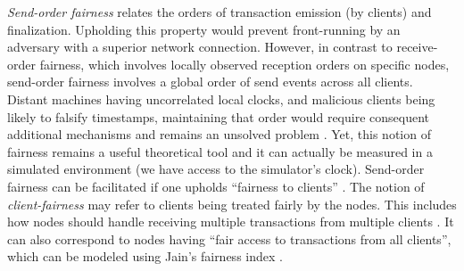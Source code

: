 {\em Send-order fairness} \cite{order_fairness_for_byzantine_consensus} relates the orders of transaction emission (by clients) and finalization. Upholding this property would prevent front-running by an adversary with a superior network connection.
However, in contrast to receive-order fairness, which involves locally observed reception orders on specific nodes, send-order fairness involves a global order of send events across all clients.
Distant machines having uncorrelated local clocks, and malicious clients being likely to falsify timestamps, maintaining that order would require consequent additional mechanisms and remains an unsolved problem \cite{order_fairness_for_byzantine_consensus}.
Yet, this notion of fairness remains a useful theoretical tool and it can actually be measured in a simulated environment (we have access to the simulator's clock).
Send-order fairness can be facilitated if one upholds ``fairness to clients'' \cite{fairness_notions_in_dag_based_dlts}.
The notion of {\em client-fairness} may refer to clients being treated fairly by the nodes. This includes how nodes should handle receiving multiple transactions from multiple clients \cite{byzid_byzantine_fault_tolerane_from_intrusion_detection,rbft_redundant_byzantine_fault_tolerance}. 
It can also correspond to nodes having ``fair access to transactions from all clients'', which can be modeled using Jain's fairness index \cite{a_quantitative_measure_of_fairness_and_discrimination_for_resource_allocation_in_shared_computer_systems}.





